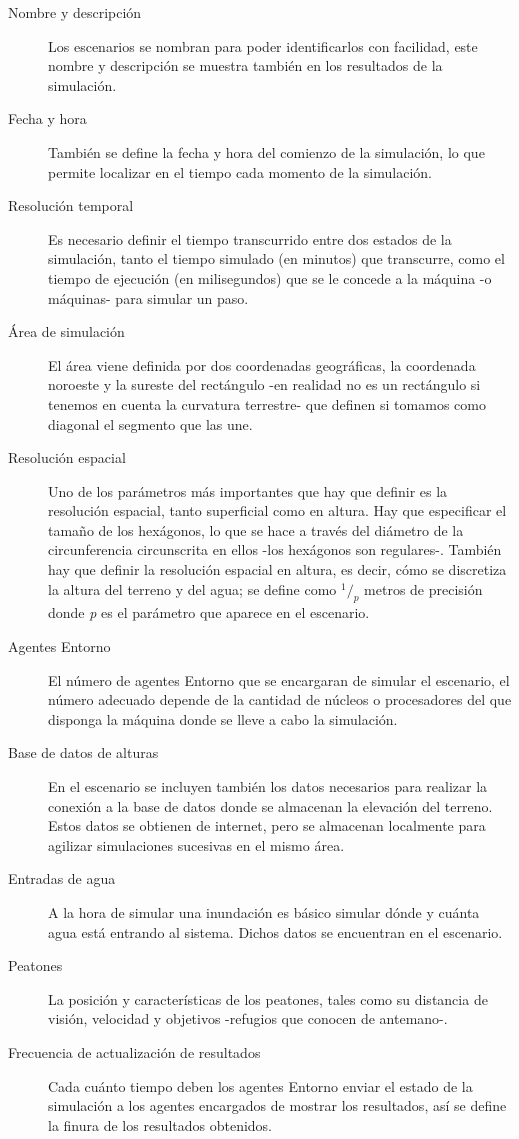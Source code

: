 \begin{description}
 \item[Nombre y descripción] Los escenarios se nombran para poder
identificarlos con facilidad, este nombre y descripción se muestra también en
los resultados de la simulación.
 \item[Fecha y hora] También se define la fecha y hora del comienzo de la
simulación, lo que permite localizar en el tiempo cada momento de la simulación.
 \item[Resolución temporal] Es necesario definir el tiempo transcurrido entre
dos estados de la simulación, tanto el tiempo simulado (en minutos) que
transcurre, como el tiempo de ejecución (en milisegundos) que se le concede a
la máquina -o máquinas- para simular un paso.
 \item[Área de simulación] El área viene definida por dos coordenadas
geográficas, la coordenada noroeste y la sureste del rectángulo -en realidad
no es un rectángulo si tenemos en cuenta la curvatura terrestre- que definen si
tomamos como diagonal el segmento que las une.
 \item[Resolución espacial] Uno de los parámetros más importantes que hay que
definir es la resolución espacial, tanto superficial como en altura. Hay que
especificar el tamaño de los hexágonos, lo que se hace a través del diámetro de
la circunferencia circunscrita en ellos -los hexágonos son regulares-. También
hay que definir la resolución espacial en altura, es decir, cómo se discretiza
la altura del terreno y del agua; se define como \begin{math}^1/_p\end{math}
metros de precisión donde {\em p} es el parámetro que aparece en el escenario.
 \item[Agentes Entorno] El número de agentes Entorno que se encargaran de
simular el escenario, el número adecuado depende de la cantidad de núcleos o
procesadores del que disponga la máquina donde se lleve a cabo la simulación.
 \item[Base de datos de alturas] En el escenario se incluyen también los datos
necesarios para realizar la conexión a la base de datos donde se almacenan la
elevación del terreno. Estos datos se obtienen de internet, pero se almacenan
localmente para agilizar simulaciones sucesivas en el mismo área.
 \item[Entradas de agua] A la hora de simular una inundación es básico simular
dónde y cuánta agua está entrando al sistema. Dichos datos se encuentran en el
escenario.
 \item[Peatones] La posición y características de los peatones, tales como su
distancia de visión, velocidad y objetivos -refugios que conocen de antemano-.
 \item[Frecuencia de actualización de resultados] Cada cuánto tiempo deben los
agentes Entorno enviar el estado de la simulación a los agentes encargados de
mostrar los resultados, así se define la finura de los resultados obtenidos.
\end{description}

